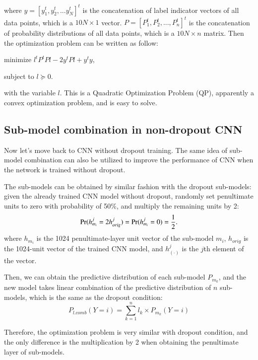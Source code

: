 \documentclass{article} %
\begin{document}
where $y = \left[ y_{1}^{t}, y_{2}^{t},...y_{N}^{t}\right]^{t}$ is the concatenation of label indicator vectors of all data points, which is a $10N\times 1$ vector. $P = \left[ P_{1}^{t},P_{2}^{t},..., P_{n}^{t}\right]^{t}$ is the concatenation of probability distributions of all data points, which is a $10N \times n$  matrix. Then the optimization problem can be written as follow:
\par
\setlength{\parindent}{3em}
minimize $l^{t}P^{t}Pl-2y^{t}Pl+y^{t}y$,
\par
\setlength{\parindent}{3em}
subject to $l\succeq 0$.
\setlength{\parindent}{0pt}
\par
with the variable $l$. This is a Quadratic Optimization Problem (QP), apparently a convex optimization problem, and is easy to solve.



\subsection{Sub-model combination in non-dropout CNN}
Now let's move back to CNN without dropout training. The same idea of sub-model combination can also be utilized to improve the performance of CNN when the network is trained without dropout. 
\par
The sub-models can be obtained by similar fashion with the dropout sub-models: given the already trained CNN model without dropout, randomly set penultimate units to zero with probability of 50\%, and multiply the remaining units by 2:
\begin{equation}
\textup{Pr}(h_{m_{i}}^{j}=2h_{orig}^{j})=\textup{Pr}(h_{m_{i}}^{j}=0)=\frac{1}{2}.
\end{equation}
where  $h_{m_{i}}$ is the 1024 penultimate-layer unit vector of the sub-model $m_{i}$, $h_{orig}$ is the 1024-unit vector of the trained CNN model, and $h_{(\cdot)}^{j}$ is the $j$th element of the vector. 
\par
Then, we can obtain the predictive distribution of each sub-model $P_{m_{k}}$, and the new model takes linear combination of the predictive distribution of $n$ sub-models, which is the same as the dropout condition:
\begin{equation}
P_{l.comb}(Y=i) = \sum_{k=1}^{n}l_{k}\times P_{m_{k}}(Y=i)
\end{equation}
\par
Therefore, the optimization problem is very similar with dropout condition, and the only difference is the multiplication by 2 when obtaining the penultimate layer of sub-models.
\end{document}
